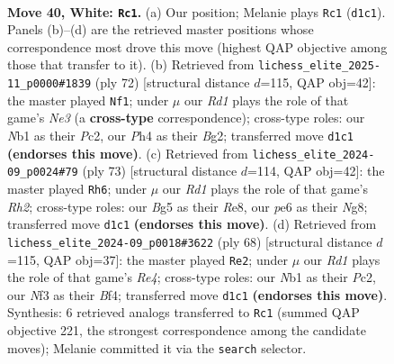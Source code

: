 \documentclass[11pt]{article}
\begin{document}
\clearpage

\begin{figure}[p]\centering
\begin{subfigure}{0.46\textwidth}\centering
\resizebox{\linewidth}{!}{%
\newchessgame
\chessboard[
  setfen={r1b1k3/6bp/1q2p3/p2p1pB1/P2p1Q1P/5N2/1n3P2/RN1R1K2 w - - 0 40},
  showmover=false,
  pgfstyle=straightmove, color=movearrow, markmove={d1-c1}
]}
\caption{}
\end{subfigure}\hfill
\begin{subfigure}{0.46\textwidth}\centering
\resizebox{\linewidth}{!}{%
\newchessgame
\chessboard[
  setfen={6k1/r6p/1nn1b1p1/2q1PpB1/2pp1P1Q/4N2R/2P3BP/7K w - - 2 37},
  showmover=false,
  pgfstyle=straightmove, color=movearrow, markmove={e3-f1}
]}
\caption{}
\end{subfigure}
\\[4pt]
\begin{subfigure}{0.46\textwidth}\centering
\resizebox{\linewidth}{!}{%
\newchessgame
\chessboard[
  setfen={3qr1nk/ppp4r/5p2/3P1B2/3P4/5QNP/PP3PP1/2R3K1 b - - 14 37},
  showmover=false,
  pgfstyle=straightmove, color=movearrow, markmove={h7-h6}
]}
\caption{}
\end{subfigure}\hfill
\begin{subfigure}{0.46\textwidth}\centering
\resizebox{\linewidth}{!}{%
\newchessgame
\chessboard[
  setfen={r4b2/3q1p1k/p2p1n2/Pp1P1N2/2p1RBPP/8/1PPQ4/6K1 w - - 1 35},
  showmover=false,
  pgfstyle=straightmove, color=movearrow, markmove={e4-e2}
]}
\caption{}
\end{subfigure}
\caption{\textbf{Move 40, White: \texttt{Rc1}.} (a) Our position; Melanie plays \texttt{Rc1} (\texttt{d1c1}). Panels (b)--(d) are the retrieved master positions whose correspondence most drove this move (highest QAP objective among those that transfer to it). (b) Retrieved from \texttt{lichess\_elite\_2025-11\_p0000\#1839} (ply 72) [structural distance $d$=115, QAP obj=42]: the master played \texttt{Nf1}; under $\mu$ our \emph{Rd1} plays the role of that game's \emph{Ne3} (a \textbf{cross-type} correspondence); cross-type roles: our \emph{N}b1 as their \emph{P}c2, our \emph{P}h4 as their \emph{B}g2; transferred move \texttt{d1c1} \textbf{(endorses this move)}. (c) Retrieved from \texttt{lichess\_elite\_2024-09\_p0024\#79} (ply 73) [structural distance $d$=114, QAP obj=42]: the master played \texttt{Rh6}; under $\mu$ our \emph{Rd1} plays the role of that game's \emph{Rh2}; cross-type roles: our \emph{B}g5 as their \emph{R}e8, our \emph{p}e6 as their \emph{N}g8; transferred move \texttt{d1c1} \textbf{(endorses this move)}. (d) Retrieved from \texttt{lichess\_elite\_2024-09\_p0018\#3622} (ply 68) [structural distance $d$=115, QAP obj=37]: the master played \texttt{Re2}; under $\mu$ our \emph{Rd1} plays the role of that game's \emph{Re4}; cross-type roles: our \emph{N}b1 as their \emph{P}c2, our \emph{N}f3 as their \emph{B}f4; transferred move \texttt{d1c1} \textbf{(endorses this move)}. Synthesis: 6 retrieved analogs transferred to \texttt{Rc1} (summed QAP objective 221, the strongest correspondence among the candidate moves); Melanie committed it via the \texttt{search} selector.}
\label{fig:thought-m78}
\end{figure}
\end{document}
